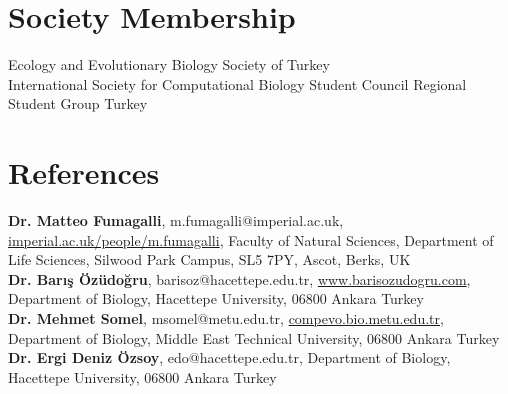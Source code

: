 \documentclass[letterpaper,11pt]{article}
\begin{document}
\section{Society Membership}		
Ecology and Evolutionary Biology Society of Turkey \\
International Society for Computational Biology Student Council Regional Student Group Turkey \\

\section{References}
\textbf{Dr. Matteo Fumagalli}, m.fumagalli@imperial.ac.uk, \href{https://www.imperial.ac.uk/people/m.fumagalli}{imperial.ac.uk/people/m.fumagalli}, Faculty of Natural Sciences, Department of Life Sciences, Silwood Park Campus, SL5 7PY, Ascot, Berks, UK \\
\textbf{Dr. Bar{\i}\c{s} \"{O}z\"{u}do\u{g}ru}, barisoz@hacettepe.edu.tr, \href{https://www.barisozudogru.com/}{www.barisozudogru.com}, Department of Biology, Hacettepe University, 06800 Ankara Turkey \\
\textbf{Dr. Mehmet Somel}, msomel@metu.edu.tr, \href{http://compevo.bio.metu.edu.tr}{compevo.bio.metu.edu.tr}, Department of Biology, Middle East Technical University, 06800 Ankara Turkey \\
\textbf{Dr. Ergi Deniz \"{O}zsoy}, edo@hacettepe.edu.tr, Department of Biology, Hacettepe University, 06800 Ankara Turkey  \\


\end{document}
